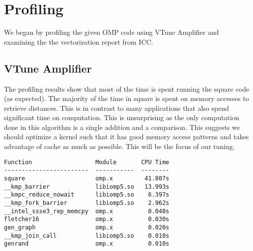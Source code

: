 \section{Profiling}\label{sec:profiling}
We began by profiling the given OMP code using VTune Amplifier and examining
the the vectorization report from ICC.

\subsection{VTune Amplifier}
The profiling results show that most of the time is spent running the square
code (as expected). The majority of the time in square is spent on memory
accesses to retrieve distances. This is in contrast to many applications that
also spend significant time on computation. This is unsurprising as the only
computation done in this algorithm is a single addition and a comparison. This
suggests we should optimize a kernel such that it has good memory access
patterns and takes advantage of cache as much as possible. This will be the
focus of our tuning.

{
\scriptsize
\begin{verbatim}
Function                  Module       CPU Time
------------------------  -----------  --------
square                    omp.x         41.807s
__kmp_barrier             libiomp5.so   13.993s
__kmpc_reduce_nowait      libiomp5.so    6.397s
__kmp_fork_barrier        libiomp5.so    2.962s
__intel_ssse3_rep_memcpy  omp.x          0.040s
fletcher16                omp.x          0.030s
gen_graph                 omp.x          0.020s
__kmp_join_call           libiomp5.so    0.010s
genrand                   omp.x          0.010s
\end{verbatim}
}

